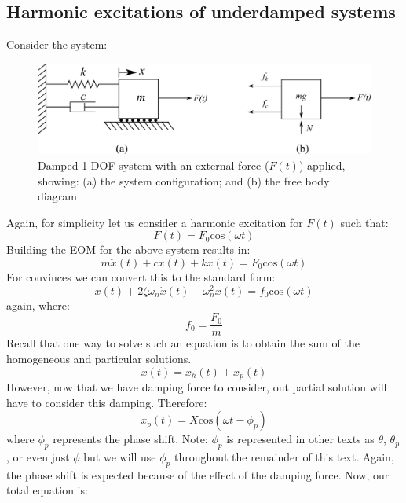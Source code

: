 \documentclass[12pt,letter]{article}
\numberwithin{ex}{section} %
\numberwithin{re}{section} %
\begin{document}
	
		\subsection{Harmonic excitations of underdamped systems}

			Consider the system:
			\begin{figure}[H]
				\centering
				\includegraphics[]{../Figures/1-DOF-spring_dashpot_mass_horizontal_forced_FBD.png}
				\caption{Damped 1-DOF system with an external force ($F(t)$) applied, showing: (a) the system configuration; and (b) the free body diagram}
			\end{figure}	
			\noindent Again, for simplicity let us consider a harmonic excitation for $F(t)$ such that:
			\begin{equation}
				F(t) = F_0\text{cos}(\omega t)
			\end{equation}							
			Building the EOM for the above system results in:
			\begin{equation}
				m \ddot{x}(t)+c\dot{x}(t)+kx(t) = F_0\text{cos}(\omega t)
			\end{equation}			
			For convinces we can convert this to the standard form:					
			\begin{equation}
				\ddot{x}(t)+2 \zeta \omega_n \dot{x}(t) +\omega_n^2x(t) = f_0\text{cos}(\omega t)
			\end{equation}					
			again, where:
			\begin{equation}
				f_0 = \frac{F_0}{m}
			\end{equation}	
			Recall that one way to solve such an equation is to obtain the sum of the homogeneous and particular solutions. 
			\begin{equation}
				x(t) = x_h(t) + x_p(t)
			\end{equation}	
			However, now that we have damping force to consider, out partial solution will have to consider this damping. Therefore:
			\begin{equation}
				x_p(t) = X \text{cos}(\omega t - \phi_p)
			\end{equation}
			where $\phi_p$ represents the phase shift. Note: $\phi_p$ is represented in other texts as $\theta$, $\theta_p$, or even just $\phi$ but we will use $\phi_p$ throughout the remainder of this text. Again, the phase shift is expected because of the effect of the damping force. Now, our total equation is:
\end{document}
